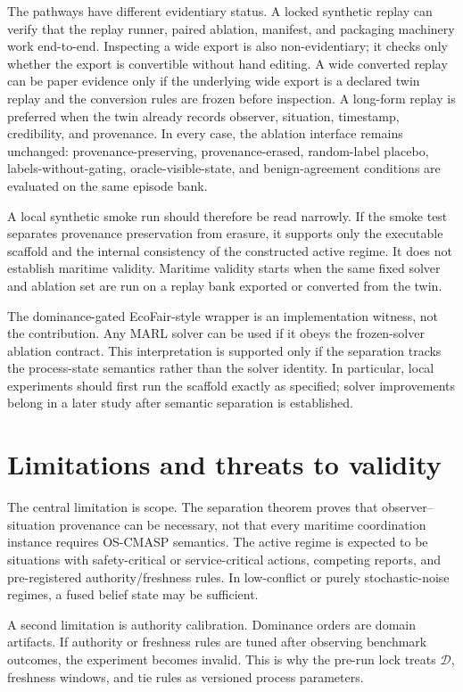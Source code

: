 \documentclass[11pt]{article}
\newcommand{\OSCMASP}{\mbox{\normalfont\textsc{OS-CMASP}}}
\newcommand{\1}{\mathbf{1}}
\theoremstyle{definition}
\theoremstyle{plain}
\theoremstyle{remark}
\begin{document}
The pathways have different evidentiary status. A locked synthetic replay can verify that the replay runner, paired ablation, manifest, and packaging machinery work end-to-end. Inspecting a wide export is also non-evidentiary; it checks only whether the export is convertible without hand editing. A wide converted replay can be paper evidence only if the underlying wide export is a declared twin replay and the conversion rules are frozen before inspection. A long-form replay is preferred when the twin already records observer, situation, timestamp, credibility, and provenance. In every case, the ablation interface remains unchanged: provenance-preserving, provenance-erased, random-label placebo, labels-without-gating, oracle-visible-state, and benign-agreement conditions are evaluated on the same episode bank.

A local synthetic smoke run should therefore be read narrowly. If the smoke test separates provenance preservation from erasure, it supports only the executable scaffold and the internal consistency of the constructed active regime. It does not establish maritime validity. Maritime validity starts when the same fixed solver and ablation set are run on a replay bank exported or converted from the twin.

The dominance-gated EcoFair-style wrapper is an implementation witness, not the contribution. Any MARL solver can be used if it obeys the frozen-solver ablation contract. This interpretation is supported only if the separation tracks the process-state semantics rather than the solver identity. In particular, local experiments should first run the scaffold exactly as specified; solver improvements belong in a later study after semantic separation is established.

\section{Limitations and threats to validity}
\label{sec:limitations}

The central limitation is scope. The separation theorem proves that observer--situation provenance can be necessary, not that every maritime coordination instance requires \OSCMASP{} semantics. The active regime is expected to be situations with safety-critical or service-critical actions, competing reports, and pre-registered authority/freshness rules. In low-conflict or purely stochastic-noise regimes, a fused belief state may be sufficient.

A second limitation is authority calibration. Dominance orders are domain artifacts. If authority or freshness rules are tuned after observing benchmark outcomes, the experiment becomes invalid. This is why the pre-run lock treats $\mathcal D$, freshness windows, and tie rules as versioned process parameters.
\end{document}
